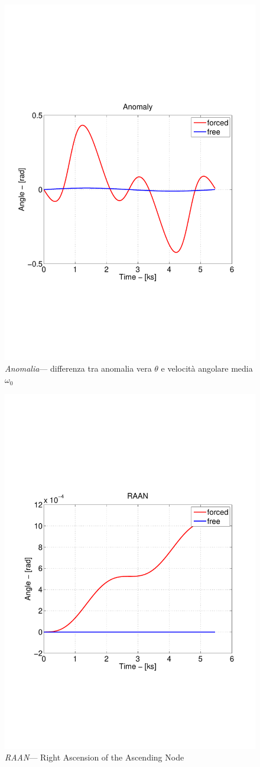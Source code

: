 \begin{figure}
	\includegraphics[width=.6\textwidth,clip=true,trim=1cm
	6cm
	1cm
	8cm]{modelling/orbit_dynamics/image/anomaly.pdf}
	\caption{\emph{Anomalia}--- differenza tra anomalia vera $\theta$ e velocità
	angolare media $\omega_0$}
\end{figure}

\begin{figure}
	\includegraphics[width=.6\textwidth,clip=true,trim=1cm
	6cm
	1cm
	8cm]{modelling/orbit_dynamics/image/RAAN.pdf}
	\caption{\emph{RAAN}--- Right Ascension of the Ascending Node}
\end{figure}